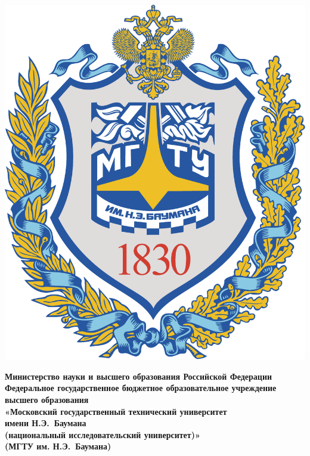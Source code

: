 \begin{titlepage}
	\noindent
    \begin{minipage}{0.15\textwidth}
		\includegraphics[width=\linewidth]{../data/bmstu-logo}
	\end{minipage}
	\fontsize{12pt}{12pt}\selectfont
	\noindent
    \begin{minipage}{0.85\textwidth}\centering
            \textbf{Министерство науки и высшего образования Российской
                    Федерации}\\
            \textbf{Федеральное государственное бюджетное образовательное
                    учреждение высшего образования}\\
            \textbf{«Московский государственный технический университет~\\имени
                    Н.Э.~Баумана}\\
            \textbf{(национальный исследовательский университет)»}\\
            \textbf{(МГТУ им. Н.Э.~Баумана)}
	\end{minipage}
    \begin{spacing}{0.2}
        ~\\
    \end{spacing}


\end{titlepage}
